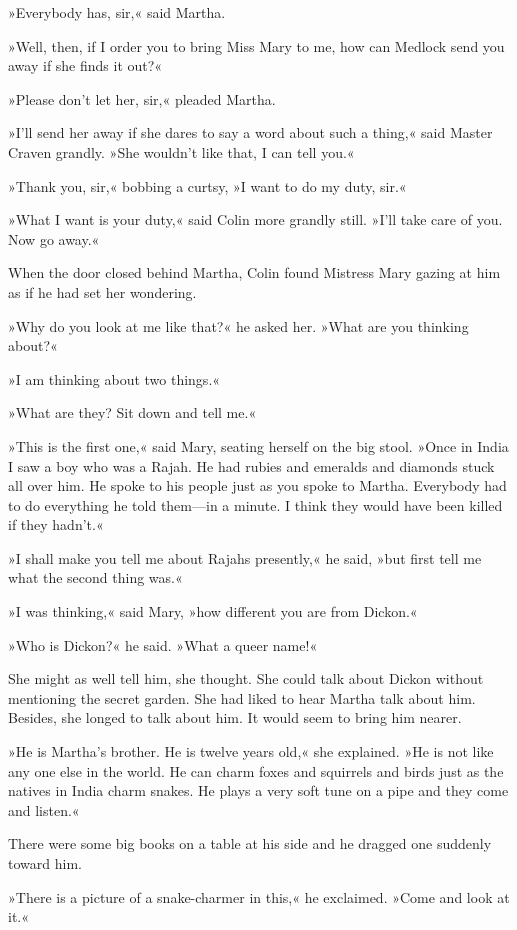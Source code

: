 »Everybody has, sir,« said Martha.

»Well, then, if I order you to bring Miss Mary to me, how can Medlock send you away if she finds it out?«

»Please don't let her, sir,« pleaded Martha.

»I'll send her away if she dares to say a word about such a thing,« said Master Craven grandly. »She wouldn't like that, I can tell you.«

»Thank you, sir,« bobbing a curtsy, »I want to do my duty, sir.«

»What I want is your duty,« said Colin more grandly still. »I'll take care of you. Now go away.«

When the door closed behind Martha, Colin found Mistress Mary gazing at him as if he had set her wondering.

»Why do you look at me like that?« he asked her. »What are you thinking about?«

»I am thinking about two things.«

»What are they? Sit down and tell me.«

»This is the first one,« said Mary, seating herself on the big stool. »Once in India I saw a boy who was a Rajah. He had rubies and emeralds and diamonds stuck all over him. He spoke to his people just as you spoke to Martha. Everybody had to do everything he told them—in a minute. I think they would have been killed if they hadn't.«

»I shall make you tell me about Rajahs presently,« he said, »but first tell me what the second thing was.«

»I was thinking,« said Mary, »how different you are from Dickon.«

»Who is Dickon?« he said. »What a queer name!«

She might as well tell him, she thought. She could talk about Dickon without mentioning the secret garden. She had liked to hear Martha talk about him. Besides, she longed to talk about him. It would seem to bring him nearer.

»He is Martha's brother. He is twelve years old,« she explained. »He is not like any one else in the world. He can charm foxes and squirrels and birds just as the natives in India charm snakes. He plays a very soft tune on a pipe and they come and listen.«

There were some big books on a table at his side and he dragged one suddenly toward him.

»There is a picture of a snake-charmer in this,« he exclaimed. »Come and look at it.«

